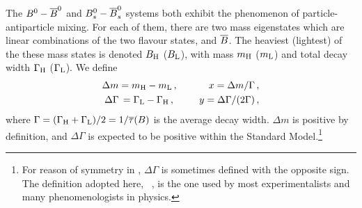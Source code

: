 The $\Bd-\Bdbar$ and $\Bs-\Bsbar$ systems
both exhibit the phenomenon of particle-antiparticle mixing. For each of them, 
there are two mass eigenstates which are linear combinations of the two flavour states,
\B and $\bar{\B}$. 
The heaviest (lightest) of the these mass states is denoted
$B_{\rm H}$ ($B_{\rm L}$),
with mass $m_{\rm H}$ ($m_{\rm L}$)
and total decay width $\Gamma_{\rm H}$ ($\Gamma_{\rm L}$). We define
\begin{eqnarray}
\Delta m = m_{\rm H} - m_{\rm L} \,, &~~~~&  x = \Delta m/\Gamma \,, \labe{dm} \\
\Delta \Gamma \, = \Gamma_{\rm L} - \Gamma_{\rm H} \,, ~ &~~~~&  y= \Delta\Gamma/(2\Gamma) \,, \labe{dg}
\end{eqnarray}
where 
$\Gamma = (\Gamma_{\rm H} + \Gamma_{\rm L})/2 =1/\bar{\tau}(\B)$ 
is the average decay width.
$\Delta m$ is positive by definition, and 
$\Delta \Gamma$ is expected to be positive within
the Standard Model.\footnote{
  \label{foot:life_mix:Eqdg}
  For reason of symmetry in , 
  $\Delta \Gamma$ is sometimes defined with the opposite sign. 
  The definition adopted here, \ie\
  , is the one used by most experimentalists and many
  phenomenologists in \B physics.}

